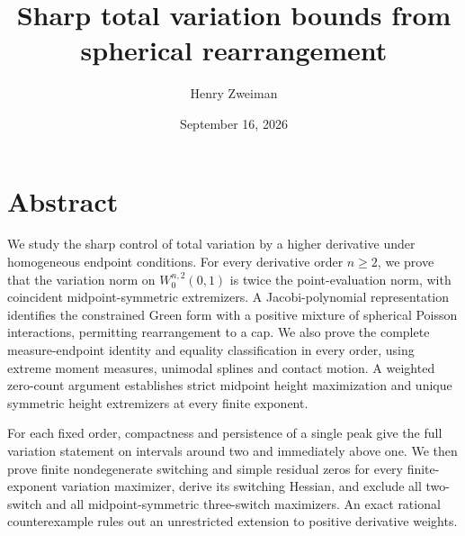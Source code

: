 \documentclass[11pt]{article}
\title{Sharp total variation bounds from spherical rearrangement}
\author{Henry Zweiman}
\date{September 16, 2026}
\begin{document}
\maketitle
{}\section{Abstract}\label{abstract}

We study the sharp control of total variation by a higher derivative
under homogeneous endpoint conditions. For every derivative order
\(n\ge2\), we prove that the variation norm on \(W_0^{n,2}(0,1)\) is
twice the point-evaluation norm, with coincident midpoint-symmetric
extremizers. A Jacobi-polynomial representation identifies the
constrained Green form with a positive mixture of spherical Poisson
interactions, permitting rearrangement to a cap. We also prove the
complete measure-endpoint identity and equality classification in every
order, using extreme moment measures, unimodal splines and contact
motion. A weighted zero-count argument establishes strict midpoint
height maximization and unique symmetric height extremizers at every
finite exponent.

For each fixed order, compactness and persistence of a single peak give
the full variation statement on intervals around two and immediately
above one. We then prove finite nondegenerate switching and simple
residual zeros for every finite-exponent variation maximizer, derive its
switching Hessian, and exclude all two-switch and all midpoint-symmetric
three-switch maximizers. An exact rational counterexample rules out an
unrestricted extension to positive derivative weights.
\end{document}
